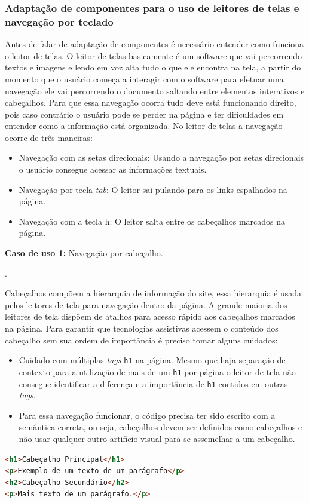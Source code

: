 \subsubsection{Adaptação de componentes para o uso de leitores de telas e navegação por teclado}
{Antes de falar de adaptação de componentes é necessário entender como funciona o leitor de telas. O leitor de telas basicamente é um software que vai percorrendo textos e imagens e lendo em voz alta tudo o que ele encontra na tela, a partir do momento que o usuário começa a interagir com o software para efetuar uma navegação ele vai percorrendo o documento saltando entre elementos interativos e cabeçalhos. Para que essa navegação ocorra tudo deve está funcionando direito, pois caso contrário o usuário pode se perder na página e ter dificuldades em entender como a informação está organizada. No leitor de telas a navegação ocorre de três maneiras: 
\begin{itemize}
    \item Navegação com as setas direcionais: Usando a navegação por setas direcionais o usuário consegue acessar as informações textuais.
    \item Navegação por tecla \textit{tab}: O leitor sai pulando para os links espalhados na página.
    \item Navegação com a tecla h: O leitor salta entre os cabeçalhos marcados na página.
\end{itemize}



{
\vspace{1.5cm}
{\centerline{\textbf{Caso de uso 1:} Navegação por cabeçalho.}}.

Cabeçalhos compõem a hierarquia de informação do site, essa hierarquia é usada pelos leitores de tela para navegação dentro da página. A grande maioria dos leitores de tela dispõem de atalhos para acesso rápido aos cabeçalhos marcados na página. Para garantir que tecnologias assistivas acessem o conteúdo dos cabeçalho sem sua ordem de importância é preciso tomar alguns cuidados: 
\begin{itemize}
    \item Cuidado com múltiplas \textit{tags} \lstinline{h1} na página. Mesmo que haja separação de contexto para a utilização de mais de um \lstinline{h1} por página o leitor de tela não consegue identificar a diferença e a importância de \lstinline{h1} contidos em outras \textit{tags}.
    \item Para essa navegação funcionar, o código precisa ter sido escrito com a semântica correta, ou seja, cabeçalhos devem ser definidos como cabeçalhos e não usar qualquer outro artificio visual para se assemelhar a um cabeçalho. 
\end{itemize}
{\begin{lstlisting}[language=html,caption=cabeçalhos com hierarquia]
<h1>Cabeçalho Principal</h1>
<p>Exemplo de um texto de um parágrafo</p>
<h2>Cabeçalho Secundário</h2>
<p>Mais texto de um parágrafo.</p>
\end{lstlisting}}

}}
